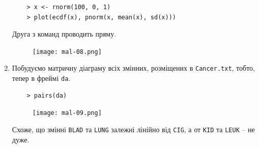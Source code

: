 \documentclass[a4paper, 12pt]{article}
\begin{document}
\begin{enumerate}
	\begin{verbatim}
	> x <- rnorm(100, 0, 1)
	> plot(ecdf(x), pnorm(x, mean(x), sd(x)))
	\end{verbatim}
	
	Друга з команд проводить пряму.
	
	\begin{figure}[H]
		\centering
		\texttt{[image: mal-08.png]}
	\end{figure}
	
	\item Побудуємо матричну діаграму всіх змінних, розміщених в \verb|Cancer.txt|, тобто, тепер в фреймі \verb|da|.
	
	\begin{verbatim}
	> pairs(da)
	\end{verbatim}
	
	\begin{figure}[H]
		\centering
		\texttt{[image: mal-09.png]}
	\end{figure}
	
	Схоже, що змінні \verb|BLAD| та \verb|LUNG| залежні лінійно від \verb|CIG|, а от \verb|KID| та \verb|LEUK| -- не дуже.
\end{enumerate}
\end{document}
